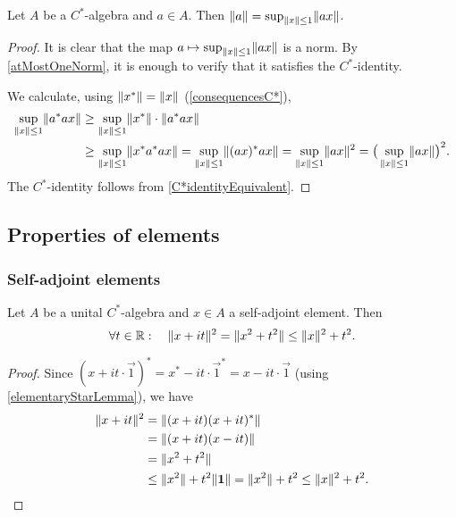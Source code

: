 \begin{lemma}
Let $A$ be a $C^*$-algebra and $a\in A$. Then $\lVert a\rVert = \sup_{\lVert x\rVert\leq 1}\lVert ax\rVert$.
\end{lemma}
\begin{proof}
It is clear that the map $a\mapsto \sup_{\lVert x\rVert\leq 1}\lVert ax\rVert$ is a norm. By \ref{atMostOneNorm}, it is enough to verify that it satisfies the $C^*$-identity.

We calculate, using $\lVert x^*\rVert = \lVert x\rVert$ (\ref{consequencesC*}),
\begin{align*}
\sup_{\lVert x\rVert\leq 1}\lVert a^*ax\rVert &\geq \sup_{\lVert x\rVert\leq 1}\lVert x^*\rVert\cdot\lVert a^*ax\rVert \\
&\geq \sup_{\lVert x\rVert\leq 1}\lVert x^*a^*ax\rVert = \sup_{\lVert x\rVert\leq 1}\lVert(ax)^*ax\rVert = \sup_{\lVert x\rVert\leq 1}\lVert ax\rVert^2 = \big(\sup_{\lVert x\rVert\leq 1}\lVert ax\rVert\big)^2.
\end{align*}
The $C^*$-identity follows from \ref{C*identityEquivalent}.
\end{proof}

\subsection{Properties of elements}
\subsubsection{Self-adjoint elements}
\begin{lemma} \label{normSelfAdjoint}
Let $A$ be a unital $C^*$-algebra and $x\in A$ a self-adjoint element. Then
\[ \forall t\in\mathbb{R}: \quad \lVert x+it\rVert^2 = \lVert x^2+t^2\rVert \leq \lVert x\rVert^2 + t^2. \]
\end{lemma}
\begin{proof}
Since $(x+it\cdot\vec{1})^* = x^* - it\cdot\vec{1}^* = x - it\cdot\vec{1}$ (using \ref{elementaryStarLemma}), we have
\begin{align*}
\lVert x+it\rVert^2 &= \lVert(x+it)(x+it)^*\rVert \\
&= \lVert(x+it)(x-it)\rVert \\
&= \lVert x^2+t^2\rVert \\
&\leq \lVert x^2\rVert+t^2\lVert\boldsymbol{\mathrm{1}}\rVert = \lVert x^2\rVert+t^2 \leq \lVert x\rVert^2+t^2.
\end{align*}
\end{proof}

